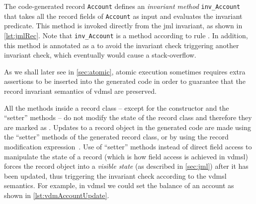 The code-generated record \texttt{Account} defines an \emph{invariant
  method} \texttt{inv\_Account} that takes all the record fields of
\texttt{Account} as input and evaluates the invariant predicate. This
method is invoked directly from the \ac{jml} invariant, as shown in
\autoref{lst:jmlRec}. Note that \texttt{inv\_Account} is a 
method according to rule . In addition, this
method is annotated as a  to avoid the invariant check
triggering another invariant check, which eventually would cause a
stack-overflow.


As we shall later see in \autoref{sec:atomic}, atomic execution
sometimes requires extra assertions to be inserted into the generated
code in order to guarantee that the record invariant semantics of
\ac{vdmsl} are preserved.

All the methods inside a record class -- except for the constructor
and the ``setter'' methods -- do not modify the state of the record
class and therefore they are marked as . Updates to a record
object in the generated code are made using the ``setter'' methods of
the generated record class, or by using the record modification
expression~\cite{Larsen&10b}. Use of ``setter'' methods instead of
direct field access to manipulate the state of a record (which is how
field access is achieved in \ac{vdmsl}) forces the record object into
a \emph{visible state} (as described in \autoref{sec:jml}) after it
has been updated, thus triggering the invariant check according to
the \ac{vdmsl} semantics. For example, in \ac{vdmsl} we could set
the balance of an account as shown in \autoref{lst:vdmAccountUpdate}.

